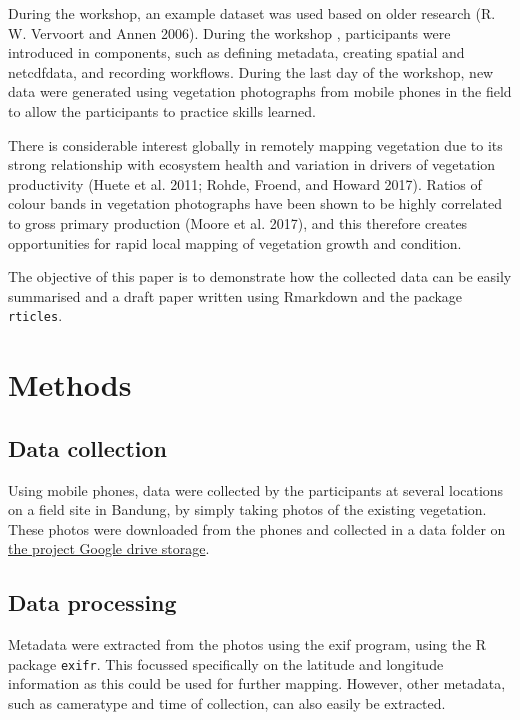 \documentclass[]{elsarticle} %
\begin{document}
During the workshop, an example dataset was used based on older research
(R. W. Vervoort and Annen 2006). During the workshop , participants were
introduced in components, such as defining metadata, creating spatial
and netcdfdata, and recording workflows. During the last day of the
workshop, new data were generated using vegetation photographs from
mobile phones in the field to allow the participants to practice skills
learned.

There is considerable interest globally in remotely mapping vegetation
due to its strong relationship with ecosystem health and variation in
drivers of vegetation productivity (Huete et al. 2011; Rohde, Froend,
and Howard 2017). Ratios of colour bands in vegetation photographs have
been shown to be highly correlated to gross primary production (Moore et
al. 2017), and this therefore creates opportunities for rapid local
mapping of vegetation growth and condition.

The objective of this paper is to demonstrate how the collected data can
be easily summarised and a draft paper written using Rmarkdown and the
package \texttt{rticles}.

\section{Methods}\label{methods}

\subsection{Data collection}\label{data-collection}

Using mobile phones, data were collected by the participants at several
locations on a field site in Bandung, by simply taking photos of the
existing vegetation. These photos were downloaded from the phones and
collected in a data folder on
\href{https://drive.google.com/drive/folders/1jgMlC3NbL_7dFVb29AjNflgxqPj6LLMf?usp=sharing}{the
project Google drive storage}.

\subsection{Data processing}\label{data-processing}

Metadata were extracted from the photos using the exif program, using
the R package \texttt{exifr}. This focussed specifically on the latitude
and longitude information as this could be used for further mapping.
However, other metadata, such as cameratype and time of collection, can
also easily be extracted.
\end{document}
